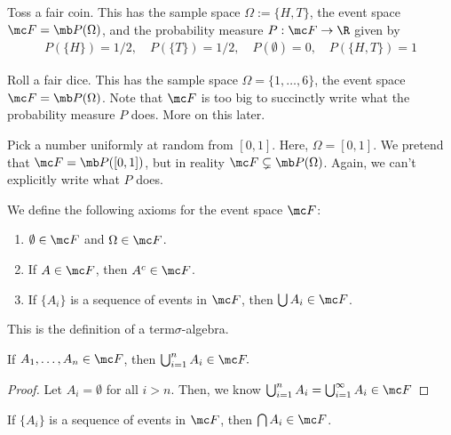 \documentclass[11pt]{article}
\begin{document}
\begin{ex}
    Toss a fair coin. This has the sample space $\Omega := \{H,T\}$, the event space $\mc F = \mb P(\Omega)$, and the probability measure $P :\mc F \to \R$ given by
    \begin{align*}
        P(\{H\}) = 1/2, \quad P(\{T\}) = 1/2, \quad P(\emptyset)=0, \quad P(\{H,T\})=1
    \end{align*}
\end{ex}

\begin{ex}
    Roll a fair dice. This has the sample space $\Omega = \{1,\dots,6\}$, the event space $\mc F = \mb P(\Omega)$. Note that $\mc F$ is too big to succinctly write what the probability measure $P$ does. More on this later.
\end{ex}

\begin{ex}
    Pick a number uniformly at random from $[0,1]$. Here, $\Omega = [0,1]$. We pretend that $\mc F = \mb P([0,1])$, but in reality $\mc F \subsetneq \mb P(\Omega)$. Again, we can't explicitly write what $P$ does.
\end{ex}

\begin{defn}
    We define the following axioms for the event space $\mc F$:
    \begin{enumerate}
        \item $\emptyset \in \mc F$ and $\Omega \in \mc F$.
        \item If $A \in \mc F$, then $A^c \in \mc F$.
        \item If $\{A_i\}$ is a sequence of events in $\mc F$, then $\bigcup A_i \in \mc F$.
    \end{enumerate}
    This is the definition of a term{$\sigma$-algebra}.
\end{defn}

\begin{rmk}
    If $A_1,\dots,A_n \in \mc F$, then $\bigcup_{i=1}^nA_i \in \mc F.$
\end{rmk}

\begin{proof}
    Let $A_i =\emptyset$ for all $i > n$. Then, we know $\bigcup_{i=1}^nA_i= \bigcup _{i=1}^\infty A_i\in \mc F$
\end{proof}

\begin{prop}
    If $\{A_i\}$ is a sequence of events in $\mc F$, then $\bigcap A_i \in \mc F$.
\end{prop}
\end{document}
